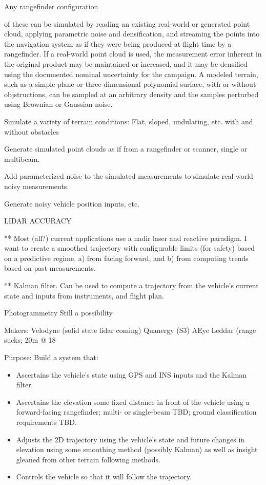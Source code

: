\documentclass[10pt,a4paper]{report}
\begin{document}
Any rangefinder configuration

of these can be simulated by reading an existing real-world or generated point cloud, applying parametric noise and densification, and streaming the points into the navigation system as if they were being produced at flight time by a rangefinder. If a real-world point cloud is used, the measurement error inherent in the original product may be maintained or increased, and it may be densified using the documented nominal uncertainty for the campaign. A modeled terrain, such as a simple plane or three-dimensional polynomial surface, with or without objstructions, can be sampled at an arbitrary density and the samples perturbed using Brownian or Gaussian noise.

Simulate a variety of terrain conditions: Flat, sloped, undulating, etc. with and without obstacles

Generate simulated point clouds as if from a rangefinder or scanner, single or multibeam.

Add parameterized noise to the simulated measurements to simulate real-world noisy measurements.

Generate noisy vehicle position inputs, etc.

LIDAR ACCURACY \cite{May2007}











** Most (all?) current applications use a nadir laser and reactive paradigm. I want to create a smoothed trajectory with configurable limits (for safety) based on a predictive regime. a) from facing forward, and b) from computing trends based on past measurements.

** Kalman filter. Can be used to compute a trajectory from the vehicle’s current state and inputs from instruments, and flight plan. 



Photogrammetry
Still a possibility

Makers:
Velodyne (solid state lidar coming)
Quanergy (S3)
AEye
Leddar (range sucks; 20m @ 18%

Purpose: Build a system that:

\begin{itemize}
\item Ascertains the vehicle's state using GPS and INS inputs and the Kalman filter.
\item Ascertains the elevation some fixed distance in front of the vehicle using a forward-facing rangefinder; multi- or single-beam TBD; ground classification requirements TBD.
\item Adjusts the 2D trajectory using the vehicle's state and future changes in elevation using some smoothing method (possibly Kalman) as well as insight gleaned from other terrain following methods.
\item Controls the vehicle so that it will follow the trajectory.
\end{itemize}




\end{document}
